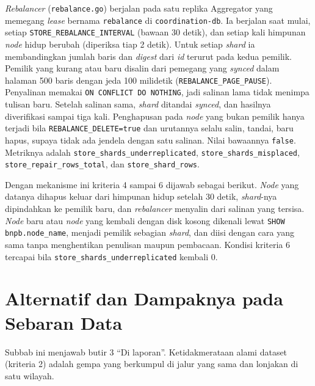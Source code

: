 \textit{Rebalancer} (\texttt{rebalance.go}) berjalan pada satu replika Aggregator yang memegang \textit{lease} bernama \texttt{rebalance} di \texttt{coordination-db}. Ia berjalan saat mulai, setiap \texttt{STORE\_REBALANCE\_INTERVAL} (bawaan 30 detik), dan setiap kali himpunan \textit{node} hidup berubah (diperiksa tiap 2 detik). Untuk setiap \textit{shard} ia membandingkan jumlah baris dan \textit{digest} dari \textit{id} terurut pada kedua pemilik. Pemilik yang kurang atau baru disalin dari pemegang yang \textit{synced} dalam halaman 500 baris dengan jeda 100 milidetik (\texttt{REBALANCE\_PAGE\_PAUSE}). Penyalinan memakai \texttt{ON CONFLICT DO NOTHING}, jadi salinan lama tidak menimpa tulisan baru. Setelah salinan sama, \textit{shard} ditandai \textit{synced}, dan hasilnya diverifikasi sampai tiga kali. Penghapusan pada \textit{node} yang bukan pemilik hanya terjadi bila \texttt{REBALANCE\_DELETE=true} dan urutannya selalu salin, tandai, baru hapus, supaya tidak ada jendela dengan satu salinan. Nilai bawaannya \texttt{false}. Metriknya adalah \texttt{store\_shards\_underreplicated}, \texttt{store\_shards\_misplaced}, \texttt{store\_repair\_rows\_total}, dan \texttt{store\_shard\_rows}.

Dengan mekanisme ini kriteria 4 sampai 6 dijawab sebagai berikut. \textit{Node} yang datanya dihapus keluar dari himpunan hidup setelah 30 detik, \textit{shard}-nya dipindahkan ke pemilik baru, dan \textit{rebalancer} menyalin dari salinan yang tersisa. \textit{Node} baru atau \textit{node} yang kembali dengan disk kosong dikenali lewat \texttt{SHOW bnpb.node\_name}, menjadi pemilik sebagian \textit{shard}, dan diisi dengan cara yang sama tanpa menghentikan penulisan maupun pembacaan. Kondisi kriteria 6 tercapai bila \texttt{store\_shards\_underreplicated} kembali 0.

\section{Alternatif dan Dampaknya pada Sebaran Data}

Subbab ini menjawab butir 3 ``Di laporan''. Ketidakmerataan alami dataset (kriteria 2) adalah gempa yang berkumpul di jalur yang sama dan lonjakan di satu wilayah.

